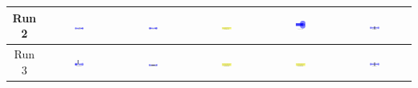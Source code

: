 \begin{table}[H]
\begin{tabular}{|c|c|c|c|c|c|}
    \hline
    Run 2 & \includegraphics[width=0.15\textwidth]{./run_2/png/gpt-4o_results/DLDChip.png} & \includegraphics[width=0.15\textwidth]{./run_2/png/claude-3-5-sonnet-20240620_results/DLDChip.png} & \includegraphics[width=0.15\textwidth]{./run_2/png/watsonx_meta-llama_llama-3-1-70b-instruct_results/DLDChip.png} & \includegraphics[width=0.15\textwidth]{./run_2/png/watsonx_meta-llama_llama-3-405b-instruct_results/DLDChip.png} & \includegraphics[width=0.15\textwidth]{./run_2/png/o1-preview_results/DLDChip.png} \\
    \hline
    Run 3 & \includegraphics[width=0.15\textwidth]{./run_3/png/gpt-4o_results/DLDChip.png} & \includegraphics[width=0.15\textwidth]{./run_3/png/claude-3-5-sonnet-20240620_results/DLDChip.png} & \includegraphics[width=0.15\textwidth]{./run_3/png/watsonx_meta-llama_llama-3-1-70b-instruct_results/DLDChip.png} & \includegraphics[width=0.15\textwidth]{./run_3/png/watsonx_meta-llama_llama-3-405b-instruct_results/DLDChip.png} & \includegraphics[width=0.15\textwidth]{./run_3/png/o1-preview_results/DLDChip.png} \\

\end{tabular}
\end{table}
